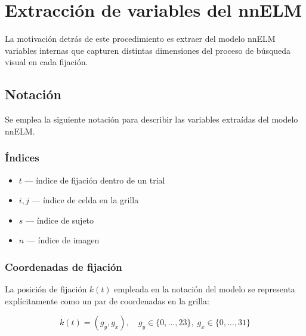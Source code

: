 \section{Extracción de variables del nnELM}
\label{sec:extraccion_features}


La motivación detrás de este procedimiento es extraer del modelo nnELM
variables internas que capturen distintas dimensiones del proceso de
búsqueda visual en cada fijación.

\subsection{Notación}

Se emplea la siguiente notación para describir
las variables extraídas del modelo nnELM.

\subsubsection*{Índices}
\begin{itemize}
    \item $t$ — índice de fijación dentro de un trial
    \item $i, j$ — índice de celda en la grilla
    \item $s$ — índice de sujeto
    \item $n$ — índice de imagen
\end{itemize}

\subsubsection*{Coordenadas de fijación}

La posición de fijación $k(t)$ empleada en la notación del modelo
se representa explícitamente como un par de coordenadas en la grilla:

\begin{equation}
    k(t) = (g_y, g_x), \quad g_y \in \{0, \ldots, 23\},\;
    g_x \in \{0, \ldots, 31\}
\end{equation}

